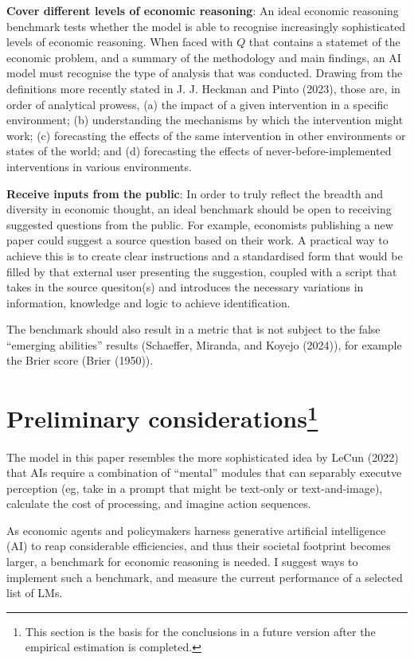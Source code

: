 \documentclass[
]{article}
\begin{document}
\textbf{Cover different levels of economic reasoning}: An ideal economic
reasoning benchmark tests whether the model is able to recognise
increasingly sophisticated levels of economic reasoning. When faced with
\(Q\) that contains a statemet of the economic problem, and a summary of
the methodology and main findings, an AI model must recognise the type
of analysis that was conducted. Drawing from the definitions more
recently stated in J. J. Heckman and Pinto (2023), those are, in order
of analytical prowess, (a) the impact of a given intervention in a
specific environment; (b) understanding the mechanisms by which the
intervention might work; (c) forecasting the effects of the same
intervention in other environments or states of the world; and (d)
forecasting the effects of never-before-implemented interventions in
various environments.

\textbf{Receive inputs from the public}: In order to truly reflect the
breadth and diversity in economic thought, an ideal benchmark should be
open to receiving suggested questions from the public. For example,
economists publishing a new paper could suggest a source question based
on their work. A practical way to achieve this is to create clear
instructions and a standardised form that would be filled by that
external user presenting the suggestion, coupled with a script that
takes in the source quesiton(s) and introduces the necessary variations
in information, knowledge and logic to achieve identification.

The benchmark should also result in a metric that is not subject to the
false ``emerging abilities'' results (Schaeffer, Miranda, and Koyejo
(2024)), for example the Brier score (Brier (1950)).

\section[Preliminary considerations]{\texorpdfstring{Preliminary
considerations\footnote{This section is the basis for the conclusions in
  a future version after the empirical estimation is completed.}}{Preliminary considerations}}\label{preliminary-considerationsconcl}

The model in this paper resembles the more sophisticated idea by LeCun
(2022) that AIs require a combination of ``mental'' modules that can
separably executve perception (eg, take in a prompt that might be
text-only or text-and-image), calculate the cost of processing, and
imagine action sequences.

As economic agents and policymakers harness generative artificial
intelligence (AI) to reap considerable efficiencies, and thus their
societal footprint becomes larger, a benchmark for economic reasoning is
needed. I suggest ways to implement such a benchmark, and measure the
current performance of a selected list of LMs.
\end{document}
